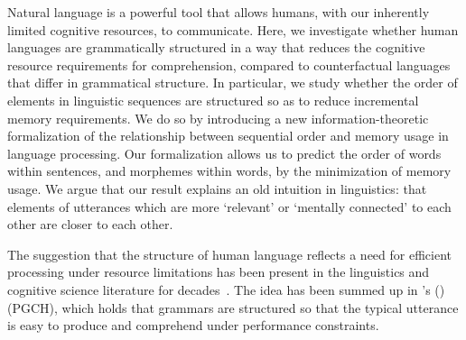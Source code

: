 
Natural language is a powerful tool that allows humans, with our inherently limited cognitive resources, to communicate.
Here, we investigate whether human languages are grammatically structured in a way that reduces the cognitive resource requirements for comprehension, compared to counterfactual languages that differ in grammatical structure.
In particular, we study whether the order of elements in linguistic sequences are structured so as to reduce incremental memory requirements. We do so by introducing a new information-theoretic formalization of the relationship between sequential order and memory usage in language processing. Our formalization allows us to predict the order of words within sentences, and morphemes within words, by the minimization of memory usage. We argue that our result explains an old intuition in linguistics: that elements of utterances which are more `relevant' or `mentally connected' to each other are closer to each other.

The suggestion that the structure of human language reflects a need for efficient processing under resource limitations has been present in the linguistics and cognitive science literature for decades~\citep{yngve1960model,berwick1984grammatical,hawkins1994performance,chomsky2005three,jaeger2011language,gibson2019efficiency,hahn2020universals}. The idea has been summed up in \citeauthor{hawkins2004efficiency}'s (\citeyear{hawkins2004efficiency})  (PGCH), which holds that grammars are structured so that the typical utterance is easy to produce and comprehend under performance constraints.


